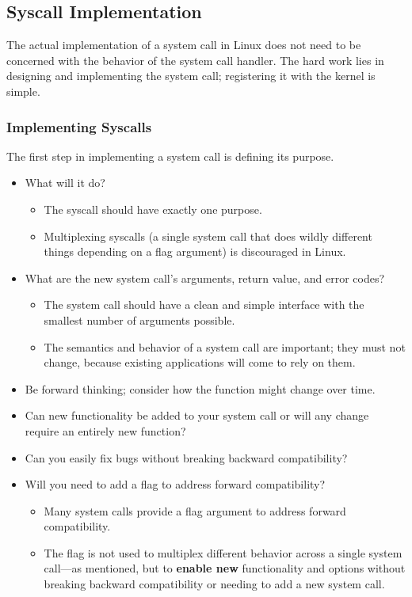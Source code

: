 \subsection{Syscall Implementation}\label{subsec:Syscall_Implementation}
The actual implementation of a system call in Linux does not need to be concerned with the behavior of the system call handler.
The hard work lies in designing and implementing the system call; registering it with the kernel is simple.

\subsubsection{Implementing Syscalls}\label{subsubsec:Implementing_Syscalls}
The first step in implementing a system call is defining its purpose.
\begin{itemize}[noitemsep]
\item What will it do?
  \begin{itemize}[noitemsep]
  \item The syscall should have exactly one purpose.
  \item Multiplexing syscalls (a single system call that does wildly different things depending on a flag argument) is discouraged in Linux.
  \end{itemize}

\item What are the new system call’s arguments, return value, and error codes?
  \begin{itemize}[noitemsep]
  \item The system call should have a clean and simple interface with the smallest number of arguments possible.
  \item The semantics and behavior of a system call are important; they must not change, because existing applications will come to rely on them.
  \end{itemize}

\item Be forward thinking; consider how the function might change over time.
\item Can new functionality be added to your system call or will any change require an entirely new function?
\item Can you easily fix bugs without breaking backward compatibility?
\item Will you need to add a flag to address forward compatibility?
  \begin{itemize}[noitemsep]
  \item Many system calls provide a flag argument to address forward compatibility.
  \item The flag is not used to multiplex different behavior across a single system call—as mentioned, but to \textbf{enable new} functionality and options without breaking backward compatibility or needing to add a new system call.
  \end{itemize}


\end{itemize}
